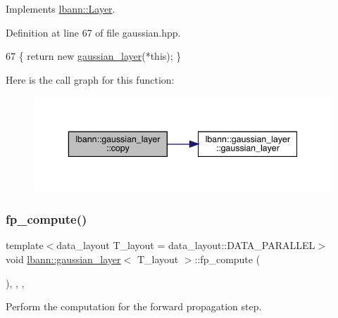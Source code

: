 Implements \hyperlink{classlbann_1_1Layer_af420f22bbac801c85483ade84588a23f}{lbann\+::\+Layer}.



Definition at line 67 of file gaussian.\+hpp.


\begin{DoxyCode}
67 \{ \textcolor{keywordflow}{return} \textcolor{keyword}{new} \hyperlink{classlbann_1_1gaussian__layer_af130978295e70d9d6521bf998052d298}{gaussian\_layer}(*\textcolor{keyword}{this}); \}
\end{DoxyCode}
Here is the call graph for this function\+:\nopagebreak
\begin{figure}[H]
\begin{center}
\leavevmode
\includegraphics[width=343pt]{classlbann_1_1gaussian__layer_af8522e7d3c3da9a123180b49d9110367_cgraph}
\end{center}
\end{figure}
\mbox{\label{classlbann_1_1gaussian__layer_a8a0f52d4f365180dbf11e9a09b359c5e}} 
\subsubsection{\texorpdfstring{fp\+\_\+compute()}{fp\_compute()}}
{\footnotesize\ttfamily template$<$data\+\_\+layout T\+\_\+layout = data\+\_\+layout\+::\+D\+A\+T\+A\+\_\+\+P\+A\+R\+A\+L\+L\+EL$>$ \\
void \hyperlink{classlbann_1_1gaussian__layer}{lbann\+::gaussian\+\_\+layer}$<$ T\+\_\+layout $>$\+::fp\+\_\+compute (\begin{DoxyParamCaption}{ }\end{DoxyParamCaption})\hspace{0.3cm}{\ttfamily [inline]}, {\ttfamily [override]}, {\ttfamily [protected]}, {\ttfamily [virtual]}}

Perform the computation for the forward propagation step. 

